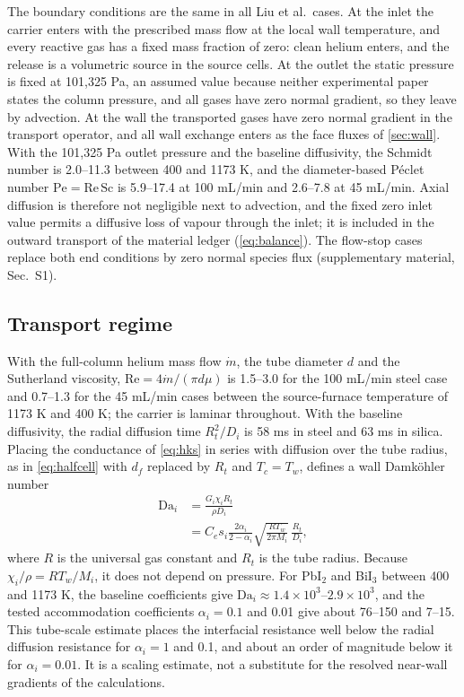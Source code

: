 The boundary conditions are the same in all Liu et al.\ cases. At the
inlet the carrier enters with the prescribed mass flow at the local
wall temperature, and every reactive gas has a fixed mass fraction of
zero: clean helium enters, and the release is a volumetric source in
the source cells. At the outlet the static pressure is fixed at
101,325 Pa, an assumed value because neither experimental paper states
the column pressure, and all gases have zero normal gradient, so they
leave by advection. At the wall the transported gases have zero normal
gradient in the transport operator, and all wall exchange enters as the
face fluxes of \cref{sec:wall}. With the 101,325 Pa outlet pressure and
the baseline diffusivity, the Schmidt number is 2.0--11.3 between 400
and 1173 K, and the diameter-based P\'eclet number $\mathrm{Pe}=\mathrm{Re}\,\mathrm{Sc}$
is 5.9--17.4 at 100 mL/min and 2.6--7.8 at 45 mL/min. Axial diffusion
is therefore not negligible next to advection, and the fixed zero
inlet value permits a diffusive loss of vapour through the inlet; it is
included in the outward transport of the material ledger
(\cref{eq:balance}). The flow-stop cases replace both end conditions by
zero normal species flux (supplementary material, Sec.~S1).

\subsection{Transport regime}
\label{sec:regime}
With the full-column helium mass flow $\dot m$, the tube diameter $d$
and the Sutherland viscosity, $\mathrm{Re}=4\dot m/(\pi d\mu)$ is
1.5--3.0 for the 100 mL/min steel case and 0.7--1.3 for the 45 mL/min
cases between the source-furnace temperature of 1173 K and 400 K; the
carrier is laminar throughout. With the baseline diffusivity, the
radial diffusion time $R_t^2/D_i$ is 58 ms in steel and 63 ms in silica.
Placing the conductance of \cref{eq:hks} in series with diffusion over
the tube radius, as in \cref{eq:halfcell} with $d_f$ replaced by $R_t$
and $T_c=T_w$, defines a wall Damk\"ohler number
\begin{equation}
 \begin{aligned}
 \mathrm{Da}_i&=\frac{G_i\chi_iR_t}{\rho D_i}\\
 &=C_es_i\frac{2\alpha_i}{2-\alpha_i}
  \sqrt{\frac{RT_w}{2\pi M_i}}\,\frac{R_t}{D_i},
 \end{aligned}
 \label{eq:damkohler}
\end{equation}
where $R$ is the universal gas constant and $R_t$ is the tube radius. Because $\chi_i/\rho=RT_w/M_i$, it does not
depend on pressure. For
PbI$_2$ and BiI$_3$ between 400 and 1173 K, the baseline coefficients
give $\mathrm{Da}_i\approx1.4\times10^3$--$2.9\times10^3$, and the
tested accommodation coefficients $\alpha_i=0.1$ and 0.01 give about
76--150 and 7--15. This tube-scale estimate places the interfacial
resistance well below the radial diffusion resistance for
$\alpha_i=1$ and 0.1, and about an order of magnitude below it for
$\alpha_i=0.01$. It is a scaling estimate, not a substitute for the
resolved near-wall gradients of the calculations.

